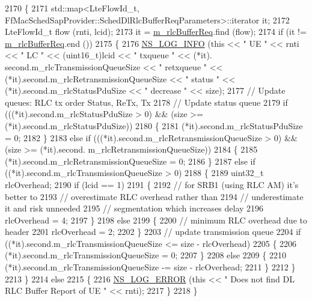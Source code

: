 \begin{DoxyCode}
2170 \{
2171   std::map<LteFlowId\_t, FfMacSchedSapProvider::SchedDlRlcBufferReqParameters>::iterator it;
2172   LteFlowId\_t flow (rnti, lcid);
2173   it = \hyperlink{classns3_1_1TdTbfqFfMacScheduler_af1c1db8b8201f905faf17ce03f0369db}{m\_rlcBufferReq}.find (flow);
2174   \textcolor{keywordflow}{if} (it != \hyperlink{classns3_1_1TdTbfqFfMacScheduler_af1c1db8b8201f905faf17ce03f0369db}{m\_rlcBufferReq}.end ())
2175     \{
2176       \hyperlink{group__logging_gafbd73ee2cf9f26b319f49086d8e860fb}{NS\_LOG\_INFO} (\textcolor{keyword}{this} << \textcolor{stringliteral}{" UE "} << rnti << \textcolor{stringliteral}{" LC "} << (uint16\_t)lcid << \textcolor{stringliteral}{" txqueue "} << (*it).
      second.m\_rlcTransmissionQueueSize << \textcolor{stringliteral}{" retxqueue "} << (*it).second.m\_rlcRetransmissionQueueSize << \textcolor{stringliteral}{" status "} 
      << (*it).second.m\_rlcStatusPduSize << \textcolor{stringliteral}{" decrease "} << size);
2177       \textcolor{comment}{// Update queues: RLC tx order Status, ReTx, Tx}
2178       \textcolor{comment}{// Update status queue}
2179       \textcolor{keywordflow}{if} (((*it).second.m\_rlcStatusPduSize > 0) && (size >= (*it).second.m\_rlcStatusPduSize))
2180         \{
2181            (*it).second.m\_rlcStatusPduSize = 0;
2182         \}
2183       \textcolor{keywordflow}{else} \textcolor{keywordflow}{if} (((*it).second.m\_rlcRetransmissionQueueSize > 0) && (size >= (*it).second.
      m\_rlcRetransmissionQueueSize))
2184         \{
2185           (*it).second.m\_rlcRetransmissionQueueSize = 0;
2186         \}
2187       \textcolor{keywordflow}{else} \textcolor{keywordflow}{if} ((*it).second.m\_rlcTransmissionQueueSize > 0)
2188         \{
2189           uint32\_t rlcOverhead;
2190           \textcolor{keywordflow}{if} (lcid == 1)
2191             \{
2192               \textcolor{comment}{// for SRB1 (using RLC AM) it's better to}
2193               \textcolor{comment}{// overestimate RLC overhead rather than}
2194               \textcolor{comment}{// underestimate it and risk unneeded}
2195               \textcolor{comment}{// segmentation which increases delay }
2196               rlcOverhead = 4;                                  
2197             \}
2198           \textcolor{keywordflow}{else}
2199             \{
2200               \textcolor{comment}{// minimum RLC overhead due to header}
2201               rlcOverhead = 2;
2202             \}
2203           \textcolor{comment}{// update transmission queue}
2204           \textcolor{keywordflow}{if} ((*it).second.m\_rlcTransmissionQueueSize <= size - rlcOverhead)
2205             \{
2206               (*it).second.m\_rlcTransmissionQueueSize = 0;
2207             \}
2208           \textcolor{keywordflow}{else}
2209             \{                    
2210               (*it).second.m\_rlcTransmissionQueueSize -= size - rlcOverhead;
2211             \}
2212         \}
2213     \}
2214   \textcolor{keywordflow}{else}
2215     \{
2216       \hyperlink{group__logging_ga0261a8db1d4ac5f79417d117634fd455}{NS\_LOG\_ERROR} (\textcolor{keyword}{this} << \textcolor{stringliteral}{" Does not find DL RLC Buffer Report of UE "} << rnti);
2217     \}
2218 \}
\end{DoxyCode}


